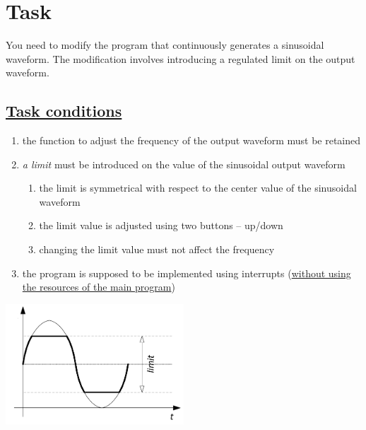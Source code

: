 \documentclass{article}
\begin{document}
\section*{Task}
You need to modify the program that continuously generates a sinusoidal waveform. The modification involves introducing a regulated limit on the output waveform.

\subsection*{\underline{Task conditions}}
\begin{enumerate}
    \item the function to adjust the frequency of the output waveform must be retained
    \item \textit{a limit} must be introduced on the value of the sinusoidal output waveform
    \begin{enumerate}
        \item the limit is symmetrical with respect to the center value of the sinusoidal waveform
        \item the limit value is adjusted using two buttons – up/down
        \item changing the limit value must not affect the frequency
    \end{enumerate}
    \item the program is supposed to be implemented using interrupts (\underline{without using the resources of the main program})
\end{enumerate}

\begin{center}
\includegraphics[width=0.5\textwidth]{../img/DAC_sinus_limit.png}
\end{center}
\end{document}

